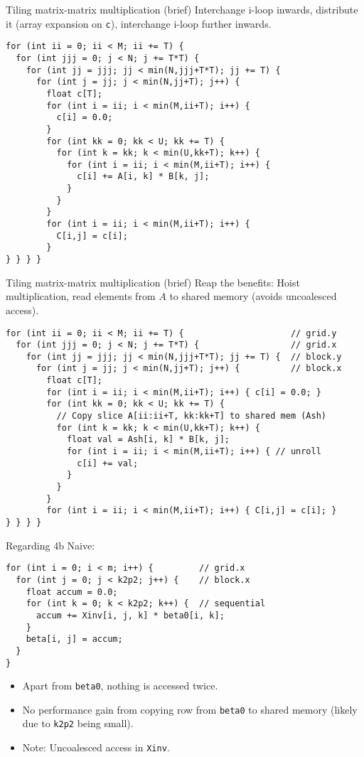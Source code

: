 \begin{frame}[fragile]{Tiling matrix-matrix multiplication (brief)}
  Interchange i-loop inwards, distribute it (array expansion on \texttt{c}),
  interchange i-loop further inwards.
\begin{verbatim}
for (int ii = 0; ii < M; ii += T) {
  for (int jjj = 0; j < N; j += T*T) {
    for (int jj = jjj; jj < min(N,jjj+T*T); jj += T) {
      for (int j = jj; j < min(N,jj+T); j++) {
        float c[T];
        for (int i = ii; i < min(M,ii+T); i++) {
          c[i] = 0.0;
        }
        for (int kk = 0; kk < U; kk += T) {
          for (int k = kk; k < min(U,kk+T); k++) {
            for (int i = ii; i < min(M,ii+T); i++) {
              c[i] += A[i, k] * B[k, j];
            }
          }
        }
        for (int i = ii; i < min(M,ii+T); i++) {
          C[i,j] = c[i];
        }
} } } }
\end{verbatim}
\end{frame}

\begin{frame}[fragile]{Tiling matrix-matrix multiplication (brief)}
  Reap the benefits: Hoist multiplication, read elements from \(A\) to shared
  memory (avoids uncoalesced access).
\begin{verbatim}
for (int ii = 0; ii < M; ii += T) {                     // grid.y
  for (int jjj = 0; j < N; j += T*T) {                  // grid.x
    for (int jj = jjj; jj < min(N,jjj+T*T); jj += T) {  // block.y
      for (int j = jj; j < min(N,jj+T); j++) {          // block.x
        float c[T];
        for (int i = ii; i < min(M,ii+T); i++) { c[i] = 0.0; }
        for (int kk = 0; kk < U; kk += T) {
          // Copy slice A[ii:ii+T, kk:kk+T] to shared mem (Ash)
          for (int k = kk; k < min(U,kk+T); k++) {
            float val = Ash[i, k] * B[k, j];
            for (int i = ii; i < min(M,ii+T); i++) { // unroll
              c[i] += val;
            }
          }
        }
        for (int i = ii; i < min(M,ii+T); i++) { C[i,j] = c[i]; }
} } } }
\end{verbatim}
\end{frame}

\begin{frame}[fragile]{Regarding 4b}
  Naive:
\begin{verbatim}
for (int i = 0; i < m; i++) {         // grid.x
  for (int j = 0; j < k2p2; j++) {    // block.x
    float accum = 0.0;
    for (int k = 0; k < k2p2; k++) {  // sequential
      accum += Xinv[i, j, k] * beta0[i, k];
    }
    beta[i, j] = accum;
  }
}
\end{verbatim}
\begin{itemize}
  \item
    Apart from \texttt{beta0}, nothing is accessed twice.
  \item
    No performance gain from copying row from \texttt{beta0} to shared memory
    (likely due to \texttt{k2p2} being small).
  \item
    Note: Uncoalesced access in \texttt{Xinv}.
\end{itemize}
\end{frame}

